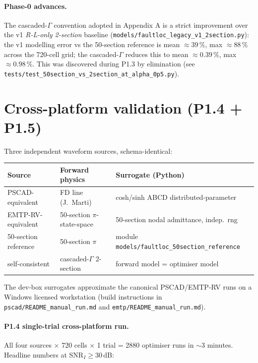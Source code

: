 \documentclass[11pt,a4paper]{article}
\begin{document}
\paragraph{Phase-0 advances.}  The cascaded-$\Gamma$ convention
adopted in Appendix A is a strict improvement over the v1
\textit{R-L-only 2-section} baseline (\texttt{models/faultloc\_legacy\_v1\_2section.py}):
the v1 modelling error vs the 50-section reference is mean
$\approx 39\,\%$, max $\approx 88\,\%$ across the 720-cell grid;
the cascaded-$\Gamma$ reduces this to mean $\approx 0.39\,\%$, max
$\approx 0.98\,\%$.  This was discovered during P1.3 by elimination
(see \texttt{tests/test\_50section\_vs\_2section\_at\_alpha\_0p5.py}).

\section{Cross-platform validation (P1.4 + P1.5)}\label{sec:crossplatform}

Three independent waveform sources, schema-identical:

\begin{longtable}{lll}
\toprule
\textbf{Source}        & \textbf{Forward physics}     & \textbf{Surrogate (Python)}\\
\midrule
PSCAD-equivalent       & FD line (J.~Marti)          & cosh/sinh ABCD distributed-parameter \\
EMTP-RV-equivalent     & 50-section $\pi$-state-space & 50-section nodal admittance, indep.\ rng \\
50-section reference   & 50-section $\pi$            & module \texttt{models/faultloc\_50section\_reference} \\
self-consistent        & cascaded-$\Gamma$ 2-section  & forward model = optimiser model \\
\bottomrule
\end{longtable}

\noindent
The dev-box surrogates approximate the canonical PSCAD/EMTP-RV runs
on a Windows licensed workstation (build instructions in
\texttt{pscad/README\_manual\_run.md} and
\texttt{emtp/README\_manual\_run.md}).

\paragraph{P1.4 single-trial cross-platform run.}  All four sources
$\times$ 720 cells $\times$ 1 trial = 2880 optimiser runs in
$\sim$3 minutes.  Headline numbers at SNR$_I\geq 30$\,dB:
\end{document}

